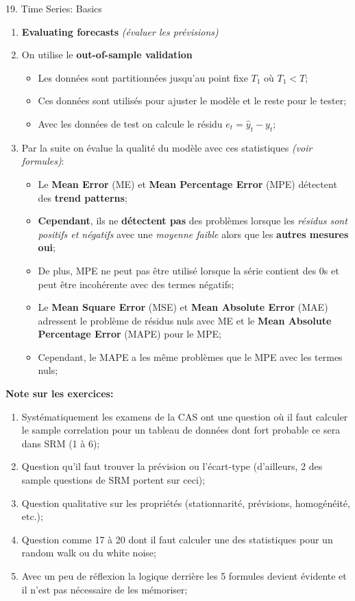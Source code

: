 \documentclass[12pt, titlepage, french]{report}
\begin{document}
\begin{CHPT_SUMM}[label = {timeseries19}]{19. Time Series: Basics}
\begin{enumerate}
	\texttt{[image: src/xbar-plots.png]}
	\item	\textbf{Evaluating forecasts} \textit{(évaluer les prévisions)}
	\item[]	On utilise le \textbf{out-of-sample validation}
		\begin{itemize}
		\item	Les données sont partitionnées jusqu'au point fixe $T_{1}$ où $T_{1} < T$;
		\item	Ces données sont utilisés pour ajuster le modèle et le reste pour le tester;
		\item	Avec les données de test on calcule le résidu $e_{t} = \hat{y}_{t} - y_{t}$;
		\end{itemize}
	\item[]	Par la suite on évalue la qualité du modèle avec ces statistiques \emph{(voir formules)}:
	\begin{itemize}
		\item	Le \textbf{Mean Error} (ME) et \textbf{Mean Percentage Error} (MPE) détectent des \textbf{trend patterns};
		\item	\textbf{Cependant}, ils ne \textbf{détectent pas} des problèmes lorsque les \textit{résidus sont positifs et négatifs} avec une \textit{moyenne faible} alors que les \textbf{autres mesures oui};
		\item	De plus, MPE ne peut pas être utilisé lorsque la série contient des 0s et peut être incohérente avec des termes négatifs;
		\item	Le \textbf{Mean Square Error} (MSE) et \textbf{Mean Absolute Error} (MAE) adressent le problème de résidus nuls avec ME et le \textbf{Mean Absolute Percentage Error} (MAPE) pour le MPE;
		\item	Cependant, le MAPE a les même problèmes que le MPE avec les termes nuls;
	\end{itemize}
\end{enumerate}
\textbf{Note sur les exercices:} 
\begin{enumerate}
	\item	Systématiquement les examens de la CAS ont une question où il faut calculer le sample correlation pour un tableau de données dont fort probable ce sera dans SRM (1 à 6);
	\item	Question qu'il faut trouver la prévision ou l'écart-type (d'ailleurs, 2 des sample questions de SRM portent sur ceci);
	\item	Question qualitative sur les propriétés (stationnarité, prévisions, homogénéité, etc.);
	\item	Question comme 17 à 20 dont il faut calculer une des statistiques pour un random walk ou du white noise;
	\item	Avec un peu de réflexion la logique derrière les 5 formules devient évidente et il n'est pas nécessaire de les mémoriser;
\end{enumerate}
\end{CHPT_SUMM}
\end{document}
